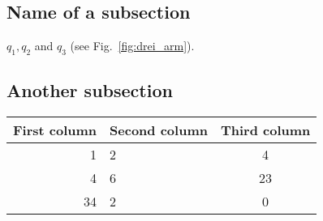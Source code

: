 \subsection{Name of a subsection}
\label{subsec:xxxxx}
%
 $q_1,q_2$ and
$q_3$ (see Fig.~\ref{fig:drei_arm}).
%
\subsection{Another subsection}





%
\begin{table}[!t]
  \begin{center}
    \leavevmode
     \begin{tabular}{rlc}\hline
      First column & Second column & Third column \\ \hline
      1 & 2 & 4\\
      4 & 6 & 23\\
      34 & 2 & 0 \\ \hline
    \end{tabular}
    \label{tab:zweiarmsystemtab}
  \end{center}
\end{table}
%

